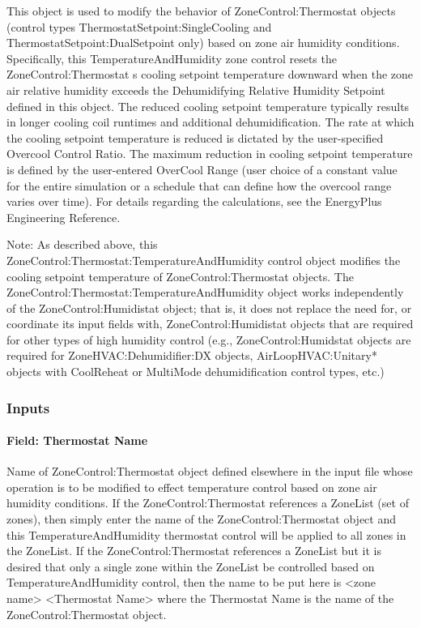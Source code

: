 This object is used to modify the behavior of ZoneControl:Thermostat objects (control types ThermostatSetpoint:SingleCooling and ThermostatSetpoint:DualSetpoint only) based on zone air humidity conditions. Specifically, this TemperatureAndHumidity zone control resets the ZoneControl:Thermostat s cooling setpoint temperature downward when the zone air relative humidity exceeds the Dehumidifying Relative Humidity Setpoint defined in this object. The reduced cooling setpoint temperature typically results in longer cooling coil runtimes and additional dehumidification. The rate at which the cooling setpoint temperature is reduced is dictated by the user-specified Overcool Control Ratio. The maximum reduction in cooling setpoint temperature is defined by the user-entered OverCool Range (user choice of a constant value for the entire simulation or a schedule that can define how the overcool range varies over time). For details regarding the calculations, see the EnergyPlus Engineering Reference.

Note: As described above, this ZoneControl:Thermostat:TemperatureAndHumidity control object modifies the cooling setpoint temperature of ZoneControl:Thermostat objects. The ZoneControl:Thermostat:TemperatureAndHumidity object works independently of the ZoneControl:Humidistat object; that is, it does not replace the need for, or coordinate its input fields with, ZoneControl:Humidistat objects that are required for other types of high humidity control (e.g., ZoneControl:Humidstat objects are required for ZoneHVAC:Dehumidifier:DX objects, AirLoopHVAC:Unitary* objects with CoolReheat or MultiMode dehumidification control types, etc.)

\subsubsection{Inputs}\label{inputs-6-031}

\paragraph{Field: Thermostat Name}\label{field-thermostat-name-1}

Name of ZoneControl:Thermostat object defined elsewhere in the input file whose operation is to be modified to effect temperature control based on zone air humidity conditions. If the ZoneControl:Thermostat references a ZoneList (set of zones), then simply enter the name of the ZoneControl:Thermostat object and this TemperatureAndHumidity thermostat control will be applied to all zones in the ZoneList. If the ZoneControl:Thermostat references a ZoneList but it is desired that only a single zone within the ZoneList be controlled based on TemperatureAndHumidity control, then the name to be put here is \textless{}zone name\textgreater{} \textless{}Thermostat Name\textgreater{} where the Thermostat Name is the name of the ZoneControl:Thermostat object.

